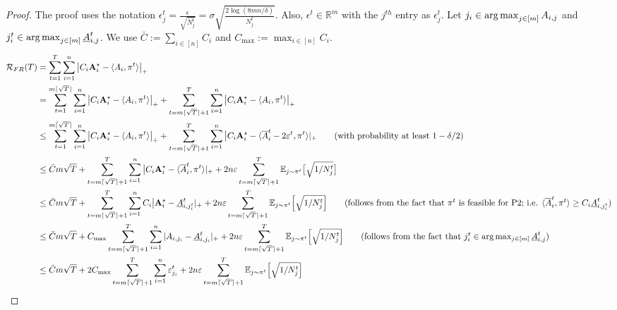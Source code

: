 \begin{proof}
The proof uses the notation $\epsilon_{j}^t=\frac{\epsilon}{\sqrt{N_j^t}}=\sigma \sqrt{\frac{2\log{(8mn/\delta)}}{N_j^t}} $. Also, $\epsilon^t\in \mathbb{R}^m$ with the $j^{th}$ entry as $\epsilon^t_j$. Let $j_i\in \operatorname*{arg\,max}_{j\in[m]} A_{i, j}$ and $j_i^t\in \operatorname*{arg\,max}_{j\in[m]}\underline{A}_{i, j}^t$. 
We use $\bar{C}:=\sum_{i\in [n]}C_i$ and $C_{\max}:=\max_{i\in [n]}C_i$.
\begin{align*}
\mathcal{R}_{FR}(T) &= \sum_{t=1}^T \sum_{i=1}^n \big | C_i \Amax_i  -   \langle A_i, \pi^t \rangle  \big|_{+} \\ 
& = \sum_{t=1}^{m\lceil \sqrt{T } \rceil } \sum_{i=1}^n \big | C_i \Amax_i  -   \langle A_i, \pi^t \rangle  \big|_{+} +  \sum_{t= m\lceil \sqrt{T } \rceil + 1}^T \sum_{i=1}^n \big | C_i \Amax_i  -   \langle A_i, \pi^t \rangle  \big|_{+} \\
& \leq \sum_{t=1}^{m\lceil \sqrt{T } \rceil } \sum_{i=1}^n \big | C_i \Amax_i  -   \langle A_i, \pi^t \rangle \big|_{+} + \sum_{t= m\lceil \sqrt{T } \rceil +1 }^T \sum_{i=1}^n \big | C_i \Amax_i  -    \langle \overline{A}_i^t   -   2\varepsilon^{t},  \pi^t \rangle |_+ \tag{with probability at least $1-\delta/2$}\\ 
&\leq \bar{C} m\sqrt{T}  + \sum_{t=m\lceil \sqrt{T } \rceil +1}^T \sum_{i=1}^n \big | C_i \Amax_i  -   \langle \overline{A}_i^t, \pi^t \rangle |_+  +   2n \varepsilon \sum_{t=m\lceil \sqrt{T } \rceil +1}^T \mathbb{E}_{j \sim \pi^t} \big [ \sqrt{1/N_{j}^{t}} \big ] \\ 
&\leq  \bar{C}m\sqrt{T} + \sum_{t=m\lceil \sqrt{T } \rceil +1}^T \sum_{i=1}^n C_i \big  |  \Amax_i  -   \underline{A}_{i, j_i^t}^t|_+  +   2n \varepsilon \sum_{t=m\lceil \sqrt{T } \rceil +1}^T \mathbb{E}_{j \sim \pi^t} \Big [\sqrt{1/N_{j}^{t}} \Big ] \tag{follows from the fact that $\pi^t$ is feasible for P2; i.e. $ \langle \overline{A}_i^t, \pi^t \rangle \geq C_i \underline{A}_{i, j_i^t}^t $}  \\ 
& \leq \bar{C}m\sqrt{T} +   C_{\max}\sum_{t= m\lceil \sqrt{T } \rceil +1 }^T \sum_{i=1}^n |A_{i, j_i} - \underline{A}_{i, j_i}^t|_{+} +  2n \varepsilon \sum_{t=m\lceil \sqrt{T } \rceil +1}^T \mathbb{E}_{j \sim \pi^t} \Big [\sqrt{1/N_{j}^{t}} \Big ]
\tag{follows from the fact that $j_i^t \in \arg\max_{j \in [m]} \underline{A}_{i,j}^t$} \\ 
& \leq \bar{C}m \sqrt{T} + 2C_{\max}  \sum_{t=m\lceil \sqrt{T } \rceil + 1}^T \sum_{i=1}^n \varepsilon_{j_i}^t +  2 n \varepsilon \sum_{t=m\lceil \sqrt{T } \rceil +1}^T \mathbb{E}_{j \sim \pi^t} \Big [\sqrt{1/N_{j}^{t}} \Big ] \\

\end{align*}
\end{proof}
